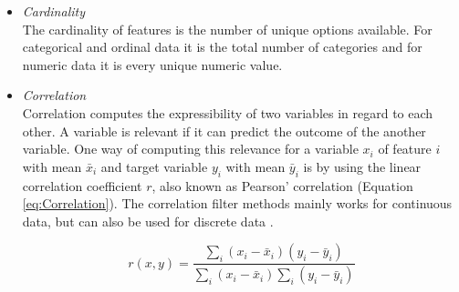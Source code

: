 \documentclass[10pt,a4paper]{report}
\begin{document}
	\begin{itemize}
		\item \textit{Cardinality} \\
		The cardinality of features is the number of unique options available. For categorical and ordinal data it is the total number of categories and for numeric data it is every unique numeric value.
		\item \textit{Correlation} \\
		Correlation computes the expressibility of two variables in regard to each other. A variable is relevant if it can predict the outcome of the another variable. One way of computing this relevance for a variable $x_i$ of feature $i$ with mean $\bar{x }_i$ and target variable $y_i$ with mean $\bar{y}_i$ is by using the linear correlation coefficient $r$, also known as Pearson' correlation \cite{yu2003feature} (Equation \ref{eq:Correlation}). The correlation filter methods mainly works for continuous data, but can also be used for discrete data \cite{hall2000correlation}.
		
		\begin{equation}\label{eq:Correlation}
		r(x,y) = \frac{\sum_{i}(x_i - \bar{x}_i)(y_i -\bar{y}_i)}{\sum_{i}(x_i - \bar{x}_i)\sum_{i}(y_i -\bar{y}_i)}
		\end{equation}
		

\end{itemize}
\end{document}
